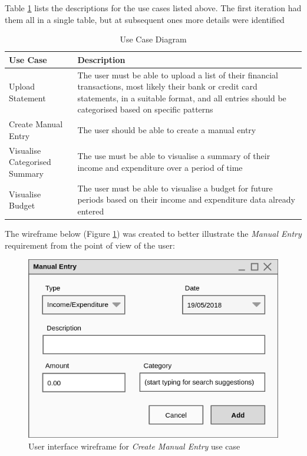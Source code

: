 Table \ref{tab:UseCaseDescriptions} lists the descriptions for the use cases
listed above. The first iteration had them all in a single table, but at
subsequent ones more details were identified
\begin{table}[!htb]
  \centering
  \begin{tabular}{|p{4cm}|p{12cm}|}
    \hline
    \textbf{Use Case}&\textbf{Description}\\
    \hline
    Upload Statement&The user must be able to upload a list of their
                     financial transactions, most likely their bank
                     or credit card statements, in a suitable format,
                     and all entries should be categorised based on 
                     specific patterns\\
    \hline
    Create Manual Entry&The user should be able to create a manual entry\\
    \hline
    Visualise Categorised Summary&The use must be able to visualise
                                  a summary of their income and expenditure
                                  over a period of time\\
    \hline
    Visualise Budget&The user must be able to visualise a budget for future
                     periods based on their income and expenditure data 
                     already entered\\
    \hline
  \end{tabular}
  \caption{Use Case Diagram} \label{tab:UseCaseDescriptions}
\end{table}

The wireframe below (Figure \ref{fig:Wireframe.CreateManualEntry}) was created
to better illustrate the \emph{Manual Entry} requirement from the point of view
of the user:
\begin{figure}[ht!]
  \begin{center}
    \includegraphics[width=14cm]{./contents/img/Wireframe_-_Manual_Entry.png}
  \end{center}
  \caption{User interface wireframe for \emph{Create Manual Entry} use case}
  \label{fig:Wireframe.CreateManualEntry}
\end{figure}
\FloatBarrier

